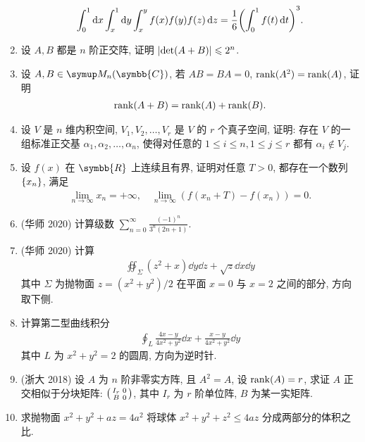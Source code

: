 \documentclass{ctexart}
\let\set\qty
\let\le\leqslant
\newcommand{\limit}[2]{\lim_{#1 \to #2}}
\newcommand{\R}{\ensuremath{\symbb{R}}}
\newcommand{\C}{\ensuremath{\symbb{C}}}
\begin{document}
\begin{enumerate}[resume=exer]
\begin{align*}
            \int_{0}^{1} \dd{x}\int_{x}^{1} \dd{y}\int_{x}^{y}f(x)f(y)f(z)\dd{z} = \frac{1}{6}\qty(\int_{0}^{1}f(t) \dd{t})^{3}.
        \end{align*}
        \item 设 $ A, B $ 都是 $ n $ 阶正交阵, 证明 $ \abs{\det(A+B)} \le 2^{n} $.
        \item 设 $ A, B \in \MM[\C] $, 若 $ AB = BA = 0 $, $ \rank(A^{2}) = \rank(A) $, 证明
        \begin{align*}
            \rank(A+B) = \rank(A) + \rank(B).
        \end{align*}
        \item 设 $ V $ 是 $ n $ 维内积空间,  $ V_{1}, V_{2}, \dots, V_{r} $ 是 $ V $ 的 $ r $ 个真子空间, 证明: 存在 $ V $ 的一组标准正交基 $ \alpha_{1}, \alpha_{2}, \dots, \alpha_{n} $, 使得对任意的 $ 1 \le i \le n, 1\le j \le r $ 都有 $ \alpha_{i} \notin V_{j} $. 
        \item 设 $ f(x) $ 在 $ \R $ 上连续且有界, 证明对任意 $ T > 0 $, 都存在一个数列 $ \set{x_{n}} $, 满足
        \begin{align*}
            \limit{n}{\infty} x_{n} = +\infty, \quad \limit{n}{\infty}(f(x_{n}+T) - f(x_{n})) = 0.
        \end{align*}
        \item (华师 2020) 计算级数 $ \sum_{n=0}^{\infty}\frac{(-1)^{n}}{3^{n}(2n+1)} $.
        \item (华师 2020) 计算
        \begin{align*}
            \oiint_{\Sigma} (z^{2}+x) \dd{y}\dd{z} + \sqrt{z} \dd{x}\dd{y}
        \end{align*}
        其中 $ \Sigma $ 为抛物面 $ z = (x^{2}+y^{2})/2 $ 在平面 $ x=0 $ 与 $ x=2 $ 之间的部分, 方向取下侧.
        \item 计算第二型曲线积分
        \begin{align*}
            \oint_{L} \frac{4x-y}{4x^{2}+y^{2}}\dd{x} + \frac{x-y}{4x^{2}+y^{2}}\dd{y}
        \end{align*}
        其中 $ L $ 为 $ x^{2} + y^{2} = 2 $ 的圆周, 方向为逆时针.
        \item (浙大 2018) 设 $ A $ 为 $ n $ 阶非零实方阵, 且 $ A^{2} = A $, 设 $ \rank(A) = r $, 求证 $ A $ 正交相似于分块矩阵: $ \smqty(I_{r} & 0 \\ B & 0) $, 其中 $ I_{r} $ 为 $ r $ 阶单位阵, $ B $ 为某一实矩阵.
        \item 求抛物面 $ x^{2} + y^{2} + az = 4a^{2} $ 将球体 $ x^{2} + y^{2} + z^{2} \le 4az $ 分成两部分的体积之比.

\end{enumerate}
\end{document}
